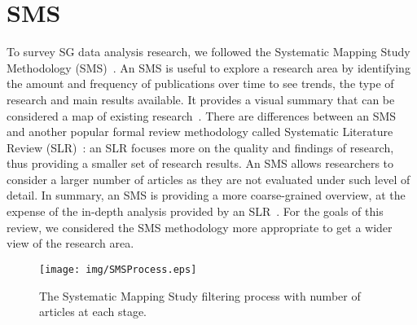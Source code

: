 \documentclass[journal]{IEEEtran}
\begin{document}
\section{SMS}
To survey SG data analysis research, we followed the Systematic Mapping Study Methodology (SMS)~\cite{ref:petersen2008systematic,ref:barn2017conductingsms}. An SMS is useful to explore a research area by identifying the amount and frequency of publications over time to see trends, the type of research and main results available. It provides a visual summary that can be considered a map of existing research~\cite{ref:petersen2008systematic,ref:barn2017conductingsms}.
There are differences between an SMS and another popular formal review methodology called Systematic Literature Review (SLR)~\cite{ref:kitchenham2004procedures,ref:petersen2008systematic,ref:petersen2015guidelines}: an SLR focuses more on the quality and findings of research, thus providing a smaller set of research results. An SMS allows researchers to consider a larger number of articles as they are not evaluated under such level of detail. In summary, an SMS is providing a more coarse-grained overview, at the expense of the in-depth analysis provided by an SLR~\cite{ref:petersen2008systematic}. For the goals of this review, we considered the SMS methodology more appropriate to get a wider view of the research area.


\begin{figure*}[!htbp]
\centering
\texttt{[image: img/SMSProcess.eps]}
\caption{The Systematic Mapping Study filtering process with number of articles at each stage.}
\label{fig:sms-process}
\end{figure*}
\end{document}
